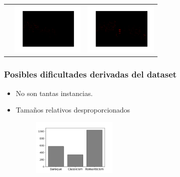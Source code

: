 \documentclass{beamer}
\theoremstyle{plain}
\newtheorem{obj2}[thm]{Objetivo [v2]}
\numberwithin{equation}{section} %
\numberwithin{figure}{section} %
\numberwithin{table}{section} %
\begin{document}
{\begin{frame}
{\begin{table}[h!]
\begin{center}
\begin{tabular}{ccc}
 &
\begin{minipage}{.3\textwidth}
\includegraphics[width=\linewidth, height=25mm]{2clasico.png}
\end{minipage}

&

\begin{minipage}{.3\textwidth}
\includegraphics[width=\linewidth, height=25mm]{3romantico.png}
\end{minipage}


\\
\end{tabular}
\end{center}
\end{table}

}


\end{frame}



\begin{frame}
\frametitle{Posibles dificultades derivadas del dataset}
\justifying

\begin{itemize}[<+->]
\item No son tantas instancias.

\item Tama\~nos relativos desproporcionados
\begin{figure}[H]
\includegraphics[height=27mm]{histogram_periods.png}
\end{figure}



\end{itemize}
\end{frame}}
\end{document}
